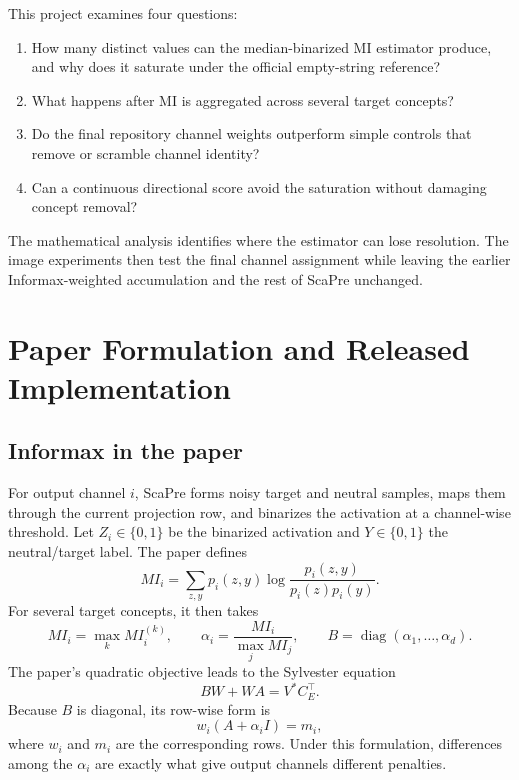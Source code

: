 \documentclass[11pt]{article}
\begin{document}
This project examines four questions:
\begin{enumerate}[label=\arabic*.]
    \item How many distinct values can the median-binarized MI estimator produce, and why does it saturate under the official empty-string reference?
    \item What happens after MI is aggregated across several target concepts?
    \item Do the final repository channel weights outperform simple controls that remove or scramble channel identity?
    \item Can a continuous directional score avoid the saturation without damaging concept removal?
\end{enumerate}

The mathematical analysis identifies where the estimator can lose resolution. The image experiments then test the final channel assignment while leaving the earlier Informax-weighted accumulation and the rest of ScaPre unchanged.

\section{Paper Formulation and Released Implementation}
\label{sec:paper_repo}
\subsection{Informax in the paper}
For output channel $i$, ScaPre forms noisy target and neutral samples, maps them through the current projection row, and binarizes the activation at a channel-wise threshold. Let $Z_i\in\{0,1\}$ be the binarized activation and $Y\in\{0,1\}$ the neutral/target label. The paper defines
\begin{equation}
    MI_i=\sum_{z,y}p_i(z,y)
    \log\frac{p_i(z,y)}{p_i(z)p_i(y)}.
    \label{eq:mi_general}
\end{equation}
For several target concepts, it then takes
\begin{equation}
    MI_i=\max_k MI_i^{(k)},
    \qquad
    \alpha_i=\frac{MI_i}{\max_j MI_j},
    \qquad
    B=\operatorname{diag}(\alpha_1,\ldots,\alpha_d).
    \label{eq:paper_alpha}
\end{equation}
The paper's quadratic objective leads to the Sylvester equation
\begin{equation}
    BW+WA=V^{*}C_E^{\top}.
    \label{eq:paper_sylvester}
\end{equation}
Because $B$ is diagonal, its row-wise form is
\begin{equation}
    w_i(A+\alpha_i I)=m_i,
    \label{eq:paper_row}
\end{equation}
where $w_i$ and $m_i$ are the corresponding rows. Under this formulation, differences among the $\alpha_i$ are exactly what give output channels different penalties.
\end{document}
